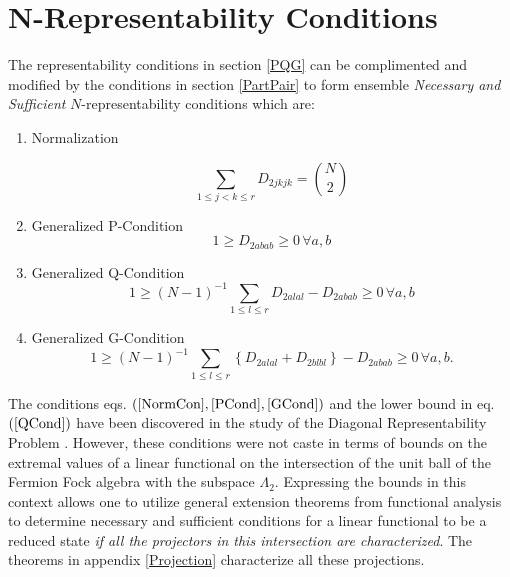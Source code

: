 \documentclass[aps,preprint,amsfonts,amssymb,showpacs,showkeys]{revtex4}%
\begin{document}
\section{N-Representability Conditions \label{NRepCon}}

The representability conditions in section \ref{PQG} can be complimented and
modified by the conditions in section \ref{PartPair} to form ensemble
\emph{Necessary and Sufficient }$N$-representability conditions which are:

\begin{enumerate}
\item Normalization%

\begin{equation}
\sum_{1\leq j<k\leq r}D_{2jkjk}=\binom{N}{2} \label{NormCon}%
\end{equation}


\item Generalized P-Condition%
\begin{equation}
1\geq D_{2abab}\geq0\,\forall a,b \label{PCond}%
\end{equation}


\item Generalized Q-Condition%
\begin{equation}
1\geq\left(  N-1\right)  ^{-1}\sum_{1\leq l\leq r}D_{2alal}-D_{2abab}%
\geq0\,\forall a,b \label{QCond}%
\end{equation}


\item Generalized G-Condition%
\begin{equation}
1\geq\left(  N-1\right)  ^{-1}\sum_{1\leq l\leq r}\left\{  D_{2alal}%
+D_{2blbl}\right\}  -D_{2abab}\geq0\,\forall a,b. \label{GCond}%
\end{equation}

\end{enumerate}

The conditions eqs. $\left(  \ref{NormCon},\ref{PCond},\ref{GCond}\right)  $
and the lower bound in eq. $\left(  \ref{QCond}\right)  $ have been discovered
in the study of the Diagonal Representability Problem
\cite{DavidsonI,DavidsonII,DavidsonIII,WeinholdWilson,Erdahl78}. However,
these conditions were not caste in terms of bounds on the extremal values of a
linear functional on the intersection of the unit ball of the Fermion Fock
algebra with the subspace $\Lambda_{2}$. Expressing the bounds in this context
allows one to utilize general extension theorems from functional analysis to
determine necessary and sufficient conditions for a linear functional to be a
reduced state \emph{if all the projectors in this intersection are
characterized}. The theorems in appendix \ref{Projection} characterize all
these projections.
\end{document}
